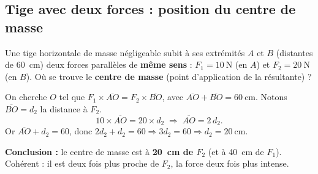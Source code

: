 \documentclass[11pt,a4paper]{article}
\begin{document}
\subsection{Tige avec deux forces : position du centre de masse}
\begin{exemple}
Une tige horizontale de masse négligeable subit à ses extrémités $A$ et $B$ (distantes de
\SI{60}{\centi\metre}) deux forces parallèles de \textbf{même sens} : $F_1 = \SI{10}{\newton}$ (en $A$) et
$F_2 = \SI{20}{\newton}$ (en $B$). Où se trouve le \textbf{centre de masse} (point d'application de la
résultante) ?

\smallskip
On cherche $O$ tel que $F_1\times\overline{AO} = F_2\times\overline{BO}$, avec
$\overline{AO}+\overline{BO}=\SI{60}{\centi\metre}$. Notons $\overline{BO}=d_2$ la distance à $F_2$.
\[
10\times\overline{AO} = 20\times d_2 \;\Longrightarrow\; \overline{AO} = 2\,d_2 .
\]
Or $\overline{AO}+d_2 = 60$, donc $2 d_2 + d_2 = 60 \Rightarrow 3 d_2 = 60 \Rightarrow d_2 = \SI{20}{\centi\metre}$.

\smallskip
\textbf{Conclusion :} le centre de masse est à \textbf{\SI{20}{\centi\metre} de $F_2$} (et à
\SI{40}{\centi\metre} de $F_1$). Cohérent : il est deux fois plus proche de $F_2$, la force deux fois
plus intense.
\end{exemple}

\end{document}
